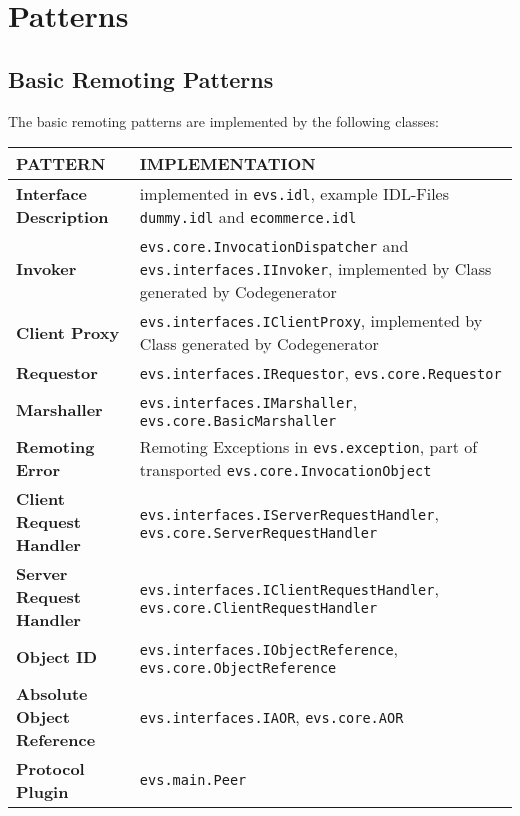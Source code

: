 \documentclass[a4paper]{article}
\begin{document}
\pagestyle{empty}
\section*{Patterns}
\vspace{0.5cm}
\subsection*{Basic Remoting Patterns}
The basic remoting patterns are implemented by the following classes:\\

\begin{small}
\begin{tabular}{| p{4cm} | p{9cm} |}\hline
\textbf{PATTERN} & \textbf{IMPLEMENTATION}\\\hline\hline
\textbf{Interface Description} & implemented in \texttt{evs.idl}, example IDL-Files \texttt{dummy.idl} and \texttt{ecommerce.idl} \\\hline
\textbf{Invoker} & \texttt{evs.core.InvocationDispatcher} and \texttt{evs.interfaces.IInvoker}, implemented by Class generated by Codegenerator\\\hline
\textbf{Client Proxy} & \texttt{evs.interfaces.IClientProxy}, implemented by Class generated by Codegenerator\\\hline
\textbf{Requestor} & \texttt{evs.interfaces.IRequestor}, \texttt{evs.core.Requestor}\\\hline
\textbf{Marshaller} & \texttt{evs.interfaces.IMarshaller}, \texttt{evs.core.BasicMarshaller}\\\hline
\textbf{Remoting Error} & Remoting Exceptions in \texttt{evs.exception}, part of transported \texttt{evs.core.InvocationObject}\\\hline
\textbf{Client Request Handler} & \texttt{evs.interfaces.IServerRequestHandler}, \texttt{evs.core.ServerRequestHandler}\\\hline
\textbf{Server Request Handler} & \texttt{evs.interfaces.IClientRequestHandler}, \texttt{evs.core.ClientRequestHandler}\\\hline
\textbf{Object ID} & \texttt{evs.interfaces.IObjectReference}, \texttt{evs.core.ObjectReference}\\\hline
\textbf{Absolute Object Reference} & \texttt{evs.interfaces.IAOR}, \texttt{evs.core.AOR}\\\hline
\textbf{Protocol Plugin} & \texttt{evs.main.Peer}\\\hline
\end{tabular}
\end{small}
\end{document}
